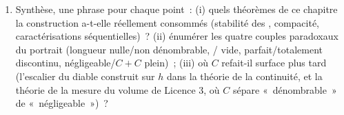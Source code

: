 \begin{problem}[{Devoir maison --- l'\omterm{def:b1:logic:sets}{ensemble} triadique de Cantor~:
longueur nulle, non dénombrable, parfait, et $C + C =
\intcc{0}{2}$}]
\begin{enumerate}[resume]
  \item Synthèse, une phrase pour chaque point~: (i) quels
        théorèmes de ce chapitre la construction a-t-elle
        réellement consommés (stabilité des , compacité,
        caractérisations séquentielles)~? (ii) énumérer les quatre
        couples paradoxaux du portrait (longueur nulle/non
        dénombrable, / vide, parfait/totalement
        discontinu, négligeable/$C+C$ plein)~; (iii) où $C$
        refait-il surface plus tard (l'escalier du diable
        construit sur $h$ dans la théorie de la continuité, et la
        théorie de la mesure du volume de Licence 3, où $C$ sépare
        «~dénombrable~» de «~négligeable~»)~?
\end{enumerate}
\end{problem}
